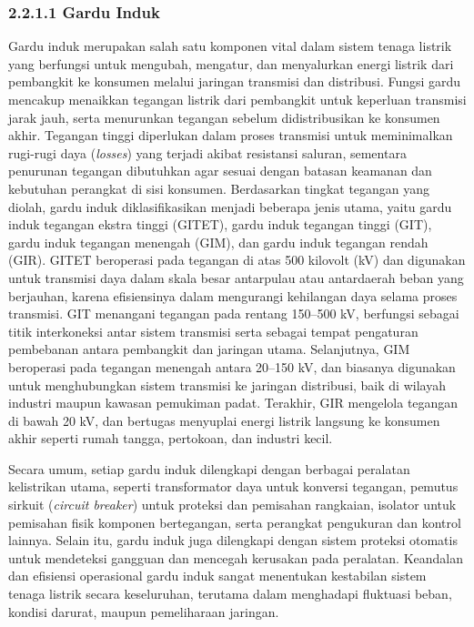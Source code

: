 \subsubsection{2.2.1.1 Gardu Induk}
Gardu induk merupakan salah satu komponen vital dalam sistem tenaga listrik yang berfungsi untuk mengubah, mengatur, dan menyalurkan energi listrik dari pembangkit ke konsumen melalui jaringan transmisi dan distribusi. Fungsi gardu mencakup menaikkan tegangan listrik dari pembangkit untuk keperluan transmisi jarak jauh, serta menurunkan tegangan sebelum didistribusikan ke konsumen akhir. Tegangan tinggi diperlukan dalam proses transmisi untuk meminimalkan rugi-rugi daya (\emph{losses}) yang terjadi akibat resistansi saluran, sementara penurunan tegangan dibutuhkan agar sesuai dengan batasan keamanan dan kebutuhan perangkat di sisi konsumen. Berdasarkan tingkat tegangan yang diolah, gardu induk diklasifikasikan menjadi beberapa jenis utama, yaitu gardu induk tegangan ekstra tinggi (GITET), gardu induk tegangan tinggi (GIT), gardu induk tegangan menengah (GIM), dan gardu induk tegangan rendah (GIR). GITET beroperasi pada tegangan di atas 500 kilovolt (kV) dan digunakan untuk transmisi daya dalam skala besar antarpulau atau antardaerah beban yang berjauhan, karena efisiensinya dalam mengurangi kehilangan daya selama proses transmisi. GIT menangani tegangan pada rentang 150--500 kV, berfungsi sebagai titik interkoneksi antar sistem transmisi serta sebagai tempat pengaturan pembebanan antara pembangkit dan jaringan utama. Selanjutnya, GIM beroperasi pada tegangan menengah antara 20--150 kV, dan biasanya digunakan untuk menghubungkan sistem transmisi ke jaringan distribusi, baik di wilayah industri maupun kawasan pemukiman padat. Terakhir, GIR mengelola tegangan di bawah 20 kV, dan bertugas menyuplai energi listrik langsung ke konsumen akhir seperti rumah tangga, pertokoan, dan industri kecil.

Secara umum, setiap gardu induk dilengkapi dengan berbagai peralatan kelistrikan utama, seperti transformator daya untuk konversi tegangan, pemutus sirkuit (\emph{circuit breaker}) untuk proteksi dan pemisahan rangkaian, isolator untuk pemisahan fisik komponen bertegangan, serta perangkat pengukuran dan kontrol lainnya. Selain itu, gardu induk juga dilengkapi dengan sistem proteksi otomatis untuk mendeteksi gangguan dan mencegah kerusakan pada peralatan. Keandalan dan efisiensi operasional gardu induk sangat menentukan kestabilan sistem tenaga listrik secara keseluruhan, terutama dalam menghadapi fluktuasi beban, kondisi darurat, maupun pemeliharaan jaringan\cite{gonen2016electric}.



